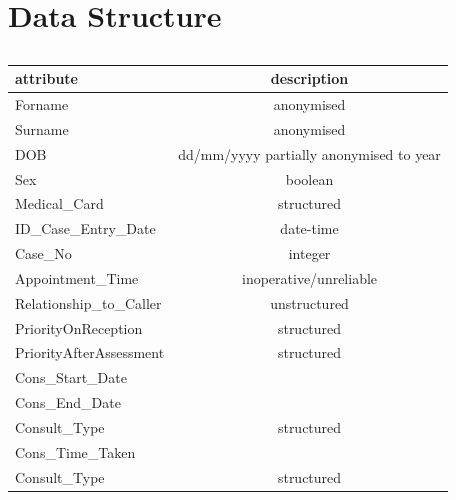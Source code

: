 
\chapter{Data Structure}






\begin{table}[]
\centering
\caption{}
\label{tab:my-table}
\begin{tabular}{lc}
\hline
attribute                                   & description                             \\ \hline
Forname                                     & anonymised                              \\
Surname                                     & anonymised                              \\
DOB                                         & dd/mm/yyyy partially anonymised to year \\
Sex                                         & boolean                                 \\
Medical\_Card                               & structured                              \\
ID\_Case\_Entry\_Date                       & date-time                               \\
Case\_No                                    & integer                                 \\
Appointment\_Time                           & inoperative/unreliable                  \\
Relationship\_to\_Caller                    & unstructured                            \\
PriorityOnReception                         & structured                              \\
PriorityAfterAssessment                     & structured                              \\
Cons\_Start\_Date                           &                                         \\
Cons\_End\_Date                             &                                         \\
Consult\_Type                               & structured                              \\
Cons\_Time\_Taken                           &                \\
Consult\_Type                               & structured                              \\


\end{tabular}
\end{table}
